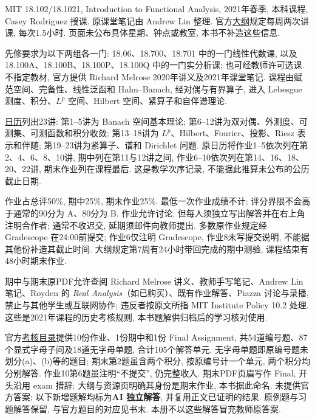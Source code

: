 \par
MIT 18.102/18.1021, Introduction to Functional Analysis, 2021年春季, 本科课程, Casey Rodriguez 授课. 原课堂笔记由 Andrew Lin 整理. 官方\href{https://ocw.mit.edu/courses/18-102-introduction-to-functional-analysis-spring-2021/pages/syllabus/}{大纲}规定每周两次讲课, 每次1.5小时. 页面未公布具体星期、钟点或教室, 本书不补造这些信息.

先修要求为以下两组各一门: 18.06、18.700、18.701 中的一门线性代数课, 以及18.100A、18.100B、18.100P、18.100Q 中的一门实分析课; 也可经教师许可选课. 不指定教材, 官方提供 Richard Melrose 2020年讲义及2021年课堂笔记. 课程由赋范空间、完备性、线性泛函和 Hahn--Banach, 经对偶与有界算子, 进入 Lebesgue 测度、积分、$L^p$ 空间、Hilbert 空间、紧算子和自伴谱理论.

\href{https://ocw.mit.edu/courses/18-102-introduction-to-functional-analysis-spring-2021/pages/calendar/}{日历}列出23讲: 第1--5讲为 Banach 空间基本理论; 第6--12讲为双对偶、外测度、可测集、可测函数和积分收敛; 第13--18讲为 $L^p$、Hilbert、Fourier、投影、Riesz 表示和伴随; 第19--23讲为紧算子、谱和 Dirichlet 问题. 原日历将作业1--5依次列在第2、4、6、8、10讲, 期中列在第11与12讲之间, 作业6--10依次列在第14、16、18、20、22讲, 期末作业列在课程最后. 这是教学次序记录, 不能据此推算未公布的公历截止日期.

作业占总评50\%, 期中25\%, 期末作业25\%. 最低一次作业成绩不计; 评分界限不会高于通常的90分为 A、80分为 B. 作业允许讨论, 但每人须独立写出解答并在右上角注明合作者; 通常不收迟交, 延期须邮件向教师提出. 多数原作业规定经 Gradescope 在24:00前提交; 作业6仅注明 Gradescope, 作业8未写提交说明, 不能据其他份补造其截止时间. 大纲规定第7周有24小时带回完成的期中测验, 课程结束有48小时期末作业.

期中与期末原PDF允许查阅 Richard Melrose 讲义、教师手写笔记、Andrew Lin 笔记、Royden 的 \textit{Real Analysis}（如已购买）、既有作业解答、Piazza 讨论与录播, 禁止与其他学生或互联网协作; 违反者按原文所指 MIT Institute Policy 10.2 处理. 这些是2021年课程的历史考核规则, 本书题解供归档后的学习核对使用.

官方\href{https://ocw.mit.edu/courses/18-102-introduction-to-functional-analysis-spring-2021/pages/assignments-and-exams/}{考核目录}提供10份作业、1份期中和1份 Final Assignment, 共54道编号题、87个显式字母子问及18道无字母单题, 合计105个解答单元. 无字母单题即原编号题未划分(a)、(b)等的题目; 期末第2题虽含两个积分, 按原编号计一个单元, 两个积分均分别解答. 作业10第6题虽注明“不提交”, 仍完整收入. 期末PDF页眉写作 Final, 开头沿用 exam 措辞; 大纲与资源页明确其身份是期末作业, 本书据此命名. 未提供官方答案; 以下新增题解均标为\textbf{AI 独立解答}, 并复用正文已证明的结果. 原例题与习题解答保留, 与官方题目的对应见书末. 本册不以这些解答冒充教师原答案.
